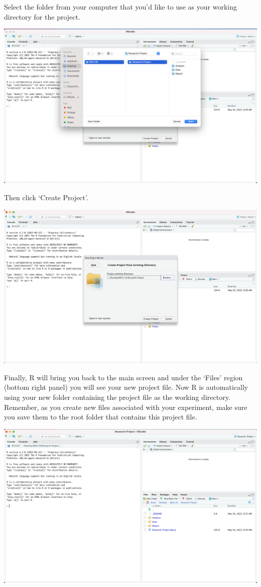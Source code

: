 \documentclass[
]{book}
\begin{document}
Select the folder from your computer that you'd like to use as your working directory for the project.

\includegraphics{images/D_new-project-old-folder-3.png}

Then click `Create Project'.

\includegraphics{images/D_new-project-old-folder-4.png}

Finally, R will bring you back to the main screen and under the `Files' region (bottom right panel) you will see your new project file. Now R is automatically using your new folder containing the project file as the working directory. Remember, as you create new files associated with your experiment, make sure you save them to the root folder that contains this project file.

\includegraphics{images/D_new-project-old-folder-5.png}
\end{document}
